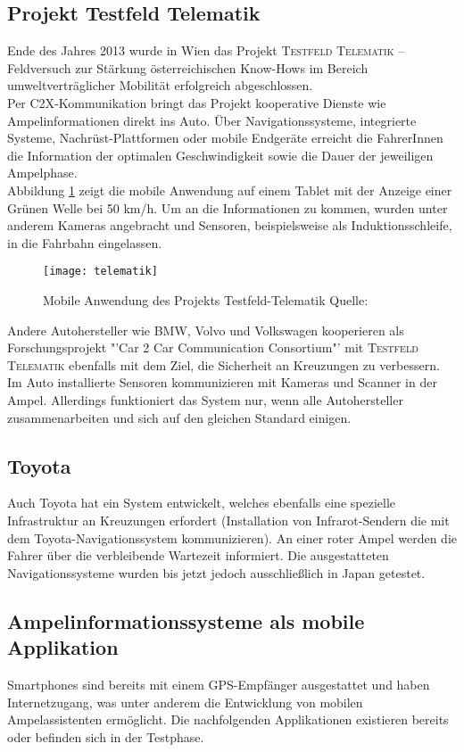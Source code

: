 \subsection*{Projekt Testfeld Telematik}
Ende des Jahres 2013 wurde in Wien das Projekt \textsc{Testfeld Telematik} -- Feldversuch zur Stärkung österreichischen Know-Hows im Bereich umweltverträglicher Mobilität erfolgreich abgeschlossen.\\
Per \gls{C2X}-Kommunikation bringt das Projekt kooperative Dienste wie Ampelinformationen direkt ins Auto. Über Navigationssysteme, integrierte Systeme, Nachrüst-Plattformen oder mobile Endgeräte erreicht die FahrerInnen die Information der optimalen Geschwindigkeit sowie die Dauer der jeweiligen Ampelphase. \cite{Telematik}\\ 
Abbildung \ref{fig:telematik} zeigt die mobile Anwendung auf einem Tablet mit der Anzeige einer Grünen Welle bei 50 km/h. Um an die Informationen zu kommen, wurden unter anderem Kameras angebracht und Sensoren, beispielsweise als Induktionsschleife, in die Fahrbahn eingelassen. \\
\begin{figure}[H]
    \centering
    \texttt{[image: telematik]} 
    \grayRule
    \caption[Projekt Testfeld-Telematik Ampelinformation]{Mobile Anwendung des Projekts Testfeld-Telematik Quelle: \cite{Telematik}}
    \label{fig:telematik}
\end{figure}  
Andere Autohersteller wie BMW, Volvo und Volkswagen kooperieren als Forschungsprojekt "'Car 2 Car Communication Consortium"' mit \textsc{Testfeld Telematik} ebenfalls mit dem Ziel, die Sicherheit an Kreuzungen zu verbessern. Im Auto installierte Sensoren kommunizieren mit Kameras und Scanner in der Ampel. Allerdings funktioniert das System nur, wenn alle Autohersteller zusammenarbeiten und sich auf den gleichen Standard einigen. \cite{Siemens}
\subsection*{Toyota}
Auch Toyota hat ein System entwickelt, welches ebenfalls eine spezielle Infrastruktur an Kreuzungen erfordert (Installation von Infrarot-Sendern die mit dem Toyota-Navigationssystem kommunizieren). An einer roter Ampel werden die Fahrer über die verbleibende Wartezeit informiert. Die ausgestatteten Navigationssysteme wurden bis jetzt jedoch ausschließlich in Japan getestet. \cite{Toyota}
%
%
\subsection{Ampelinformationssysteme als mobile Applikation}
\glspl{Smartphone} sind bereits mit einem \gls{GPS}-Empfänger ausgestattet und haben Internetzugang, was unter anderem die Entwicklung von mobilen Ampelassistenten ermöglicht. Die nachfolgenden Applikationen existieren bereits oder befinden sich in der Testphase.

